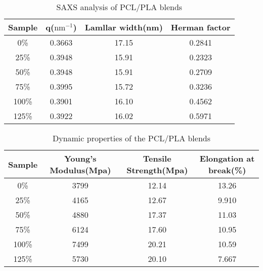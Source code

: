 \documentclass{Head}
\begin{document}
\begin{table}
    \caption{SAXS analysis of PCL/PLA blends}
    \begin{tabular}{cccc}
        \toprule
        Sample & \textbf{q}($\mathrm{nm^{-1}}$) & Lamllar width(nm) & Herman factor \\
        \midrule
        0\%    & 0.3663                         & 17.15             & 0.2841        \\
        25\%   & 0.3948                         & 15.91             & 0.2323        \\
        50\%   & 0.3948                         & 15.91             & 0.2709        \\
        75\%   & 0.3995                         & 15.72             & 0.3236        \\
        100\%  & 0.3901                         & 16.10             & 0.4562        \\
        125\%  & 0.3922                         & 16.02             & 0.5971        \\
        \bottomrule
    \end{tabular}
\end{table}
\begin{table}
    \caption{Dynamic properties of the PCL/PLA blends}
    \begin{tabular}{cccc}
        \toprule
        Sample & Young's Modulus(Mpa) & Tensile Strength(Mpa) & Elongation at break(\%) \\
        \midrule
        0\%    & 3799                 & 12.14                 & 13.26                   \\
        25\%   & 4165                 & 12.67                 & 9.910                   \\
        50\%   & 4880                 & 17.37                 & 11.03                   \\
        75\%   & 6124                 & 17.60                 & 10.95                   \\
        100\%  & 7499                 & 20.21                 & 10.59                   \\
        125\%  & 5730                 & 20.10                 & 7.667                   \\
        \bottomrule
    \end{tabular}
\end{table}
\end{document}
